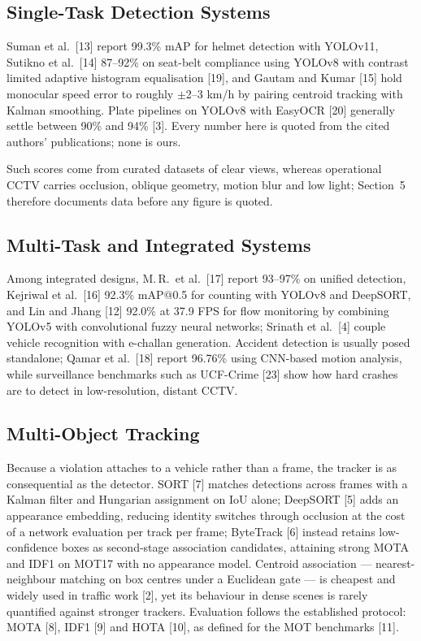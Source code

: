 \documentclass[10pt,a4paper,twocolumn]{article}
\begin{document}
\subsection{Single-Task Detection Systems}
Suman et al.\ [13] report 99.3\% mAP for helmet detection with YOLOv11, Sutikno et al.\ [14] 87--92\% on seat-belt
compliance using YOLOv8 with contrast limited adaptive histogram equalisation [19], and Gautam and Kumar [15] hold
monocular speed error to roughly $\pm$2--3 km/h by pairing centroid tracking with Kalman smoothing. Plate pipelines on
YOLOv8 with EasyOCR [20] generally settle between 90\% and 94\% [3]. Every number here is quoted from the cited
authors' publications; none is ours.

Such scores come from curated datasets of clear views, whereas operational CCTV carries occlusion, oblique geometry,
motion blur and low light; Section~5 therefore documents data before any figure is quoted.

\subsection{Multi-Task and Integrated Systems}
Among integrated designs, M.\,R.\ et al.\ [17] report 93--97\% on unified detection, Kejriwal et al.\ [16] 92.3\%
mAP@0.5 for counting with YOLOv8 and DeepSORT, and Lin and Jhang [12] 92.0\% at 37.9 FPS for flow monitoring by
combining YOLOv5 with convolutional fuzzy neural networks; Srinath et al.\ [4] couple vehicle recognition with
e-challan generation. Accident detection is usually posed standalone; Qamar et
al.\ [18] report 96.76\% using CNN-based motion analysis, while surveillance benchmarks such as UCF-Crime [23] show how
hard crashes are to detect in low-resolution, distant CCTV.

\subsection{Multi-Object Tracking}
Because a violation attaches to a vehicle rather than a frame, the tracker is as consequential as the detector.
SORT [7] matches detections across frames with a Kalman filter and Hungarian assignment on IoU alone; DeepSORT [5] adds
an appearance embedding, reducing identity switches through occlusion at the cost of a network evaluation per track
per frame; ByteTrack [6] instead retains low-confidence boxes as second-stage association candidates, attaining strong
MOTA and IDF1 on MOT17 with no appearance model. Centroid association --- nearest-neighbour matching on box centres
under a Euclidean gate --- is cheapest and widely used in traffic work [2], yet its behaviour in dense scenes is rarely
quantified against stronger trackers. Evaluation follows the established protocol: MOTA [8], IDF1 [9] and HOTA [10],
as defined for the MOT benchmarks [11].
\end{document}
